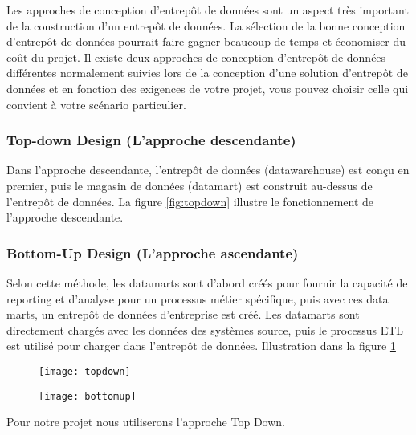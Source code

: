 Les approches de conception d'entrepôt de données sont un aspect très important de la construction d'un entrepôt de données. La sélection de la bonne conception d'entrepôt de données pourrait faire gagner beaucoup de temps et économiser du coût du projet. Il existe deux approches de conception d'entrepôt de données différentes normalement suivies lors de la conception d'une solution d'entrepôt de données et en fonction des exigences de votre projet, vous pouvez choisir celle qui convient à votre scénario particulier. 

\subsubsection{Top-down Design (L'approche descendante)}

Dans l'approche descendante, l'entrepôt de données (datawarehouse) est conçu en premier, puis le magasin de données (datamart) est construit au-dessus de l'entrepôt de données. La figure \ref{fig:topdown} illustre le fonctionnement de l'approche descendante.

\subsubsection{Bottom-Up Design (L'approche ascendante)}

Selon cette méthode, les datamarts sont d'abord créés pour fournir la capacité de reporting et d'analyse pour un processus métier spécifique, puis avec ces data marts, un entrepôt de données d'entreprise est créé. Les datamarts sont directement chargés avec les données des systèmes source, puis le processus ETL est utilisé pour charger dans l'entrepôt de données. Illustration dans la figure \ref{fig:bottomup}

\begin{figure}[H]
    \centering
    \begin{minipage}{.5\textwidth}
      \centering
      \texttt{[image: topdown]}
      \label{fig:topdown}
    \end{minipage}%
    \begin{minipage}{.5\textwidth}
      \centering
      \texttt{[image: bottomup]}
      \label{fig:bottomup}
    \end{minipage}
\end{figure}


Pour notre projet nous utiliserons l'approche Top Down.




